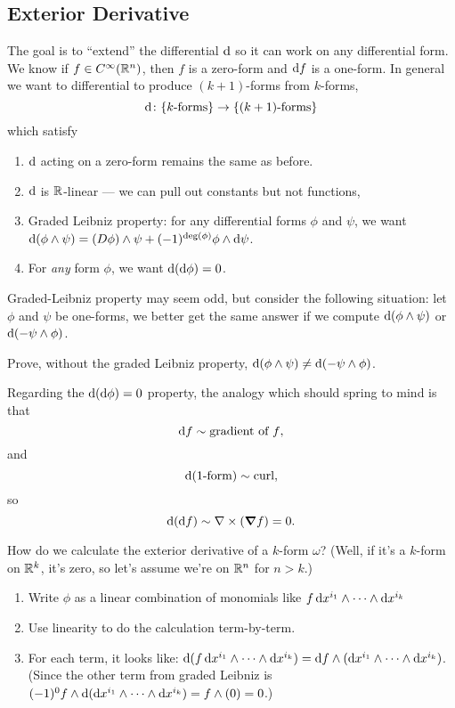 \subsection{Exterior Derivative}

\M
The goal is to ``extend'' the differential $\mathrm{d}$ so it can work on any
differential form. We know if $f\in C^{\infty}(\mathbb{R}^{n})$, then $f$ is a
zero-form and $\mathrm{d} f$ is a one-form. In general we want to differential
to produce $(k+1)$-forms from $k$-forms,
\begin{equation}
\mathrm{d}\colon\{\mbox{$k$-forms}\}\to\{\mbox{$(k+1)$-forms}\}
\end{equation}
which satisfy
\begin{enumerate}
\item $\mathrm{d}$ acting on a zero-form remains the same as before.
\item $\mathrm{d}$ is $\mathbb{R}$-linear --- we can pull out constants but not functions,
\item Graded Leibniz property: for any differential forms $\phi$ and
  $\psi$, we want $\mathrm{d}(\phi\wedge\psi) = (D\phi)\wedge\psi+(-1)^{\operatorname{deg}(\phi)}\phi\wedge\mathrm{d}\psi$.
\item For \emph{any} form $\phi$, we want $\mathrm{d}(\mathrm{d}\phi)=0$.
\end{enumerate}
Graded-Leibniz property may seem odd, but consider the following
situation:
let $\phi$ and $\psi$ be one-forms, we better get the same answer if we
compute $\mathrm{d}(\phi\wedge\psi)$ or $\mathrm{d}(-\psi\wedge\phi)$.

\begin{exercise}
  Prove, without the graded Leibniz property,
  $\mathrm{d}(\phi\wedge\psi)\neq\mathrm{d}(-\psi\wedge\phi)$.
\end{exercise}

\M
Regarding the $\mathrm{d}(\mathrm{d}\phi)=0$ property, the analogy which should spring
to mind is that
\begin{equation*}
\mathrm{d} f\sim\mbox{gradient of $f$},
\end{equation*}
and
\begin{equation*}
\mathrm{d}(\mbox{$1$-form})\sim\mbox{curl},
\end{equation*}
so
\begin{equation}
\mathrm{d}(\mathrm{d} f)\sim\nabla\times(\boldsymbol{\nabla}f)=0.
\end{equation}

How do we calculate the exterior derivative of a $k$-form $\omega$?
(Well, if it's a $k$-form on $\mathbb{R}^{k}$, it's zero, so let's assume we're
on $\mathbb{R}^{n}$ for $n>k$.)
\begin{enumerate}
\item Write $\phi$ as a linear combination of monomials like $f\,\mathrm{d} x^{i_{1}}\wedge\dots\wedge\mathrm{d} x^{i_{k}}$
\item Use linearity to do the calculation term-by-term.
\item For each term, it looks like:
$\mathrm{d}(f\,\mathrm{d} x^{i_{1}}\wedge\dots\wedge\mathrm{d} x^{i_{k}}) = \mathrm{d} f\wedge(\mathrm{d} x^{i_{1}}\wedge\dots\wedge\mathrm{d} x^{i_{k}})$.
(Since the other term from graded Leibniz is $(-1)^{0}f\wedge\mathrm{d}(\mathrm{d} x^{i_{1}}\wedge\dots\wedge\mathrm{d} x^{i_{k}})=f\wedge(0)=0$.)
\end{enumerate}

